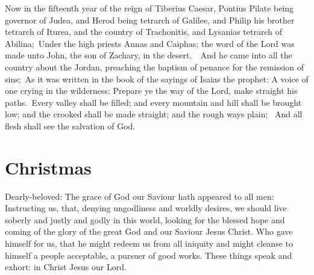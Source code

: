\begin{multicols}{2}

Now in the fifteenth year of the reign of Tiberius Caesar, Pontius Pilate being
governor of Judea, and Herod being tetrarch of Galilee, and Philip his brother
tetrarch of Iturea, and the country of Trachonitis, and Lysanias tetrarch of
Abilina; Under the high priests Annas and Caiphas; the word of the Lord was
made unto John, the son of Zachary, in the desert.  And he came into all the
country about the Jordan, preaching the baptism of penance for the remission of
sins; As it was written in the book of the sayings of Isaias the prophet: A
voice of one crying in the wilderness: Prepare ye the way of the Lord, make
straight his paths. Every valley shall be filled; and every mountain and hill
shall be brought low; and the crooked shall be made straight; and the rough
ways plain;  And all flesh shall see the salvation of God.


\section{Christmas}




Dearly-beloved: The grace of God our Saviour hath appeared to all men: Instructing us,
that, denying ungodliness and worldly desires, we should live soberly and
justly and godly in this world, looking for the blessed hope and coming of the
glory of the great God and our Saviour Jesus Christ.  Who gave himself for us,
that he might redeem us from all iniquity and might cleanse to himself a people
acceptable, a pursuer of good works.  These things speak and exhort: in Christ Jesus our Lord.




\end{multicols}
